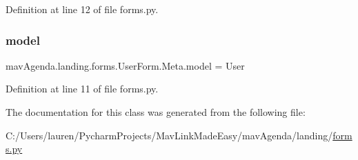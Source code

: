 Definition at line 12 of file forms.\+py.

\mbox{\label{classmavAgenda_1_1landing_1_1forms_1_1UserForm_1_1Meta_ab6d084f5f3a564e17ea9a015494d614c}} 
\subsubsection{\texorpdfstring{model}{model}}
{\footnotesize\ttfamily mav\+Agenda.\+landing.\+forms.\+User\+Form.\+Meta.\+model = User\hspace{0.3cm}{\ttfamily [static]}}



Definition at line 11 of file forms.\+py.



The documentation for this class was generated from the following file\+:\begin{DoxyCompactItemize}
\item 
C\+:/\+Users/lauren/\+Pycharm\+Projects/\+Mav\+Link\+Made\+Easy/mav\+Agenda/landing/\mbox{\hyperlink{forms_8py}{forms.\+py}}\end{DoxyCompactItemize}
